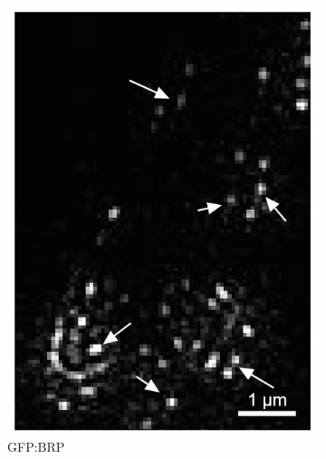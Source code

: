 \begin{figure}
\begin{subfigure}[t]{0.24\textwidth}
		\includegraphics[width=\linewidth]{images/DeepSIM_NMJ_AO_ROI1_GFP.jpg}
		\caption{GFP:BRP}
		\label{fig:DeepSIM_NMJ_AO_ROI1_GFP}
	\end{subfigure}
	\begin{subfigure}[t]{0.242\textwidth}
		\centering

\end{subfigure}
\end{figure}
